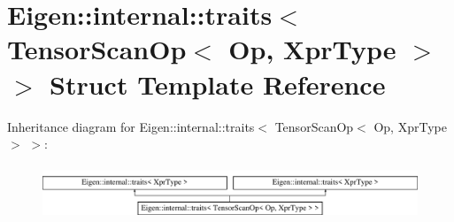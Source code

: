 \hypertarget{struct_eigen_1_1internal_1_1traits_3_01_tensor_scan_op_3_01_op_00_01_xpr_type_01_4_01_4}{}\section{Eigen\+:\+:internal\+:\+:traits$<$ Tensor\+Scan\+Op$<$ Op, Xpr\+Type $>$ $>$ Struct Template Reference}
\label{struct_eigen_1_1internal_1_1traits_3_01_tensor_scan_op_3_01_op_00_01_xpr_type_01_4_01_4}
Inheritance diagram for Eigen\+:\+:internal\+:\+:traits$<$ Tensor\+Scan\+Op$<$ Op, Xpr\+Type $>$ $>$\+:\begin{figure}[H]
\begin{center}
\leavevmode
\includegraphics[height=1.642229cm]{struct_eigen_1_1internal_1_1traits_3_01_tensor_scan_op_3_01_op_00_01_xpr_type_01_4_01_4}
\end{center}
\end{figure}
